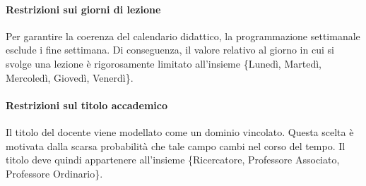 \paragraph{Restrizioni sui giorni di lezione}
Per garantire la coerenza del calendario didattico, la programmazione settimanale esclude i fine settimana.
Di conseguenza, il valore relativo al giorno in cui si svolge una lezione è rigorosamente limitato all'insieme \{Lunedì, Martedì, Mercoledì, Giovedì, Venerdì\}.

\paragraph{Restrizioni sul titolo accademico}
Il titolo del docente viene modellato come un dominio vincolato. Questa scelta è motivata dalla scarsa probabilità che tale campo cambi nel corso del tempo.
Il titolo deve quindi appartenere all'insieme \{Ricercatore, Professore Associato, Professore Ordinario\}.
